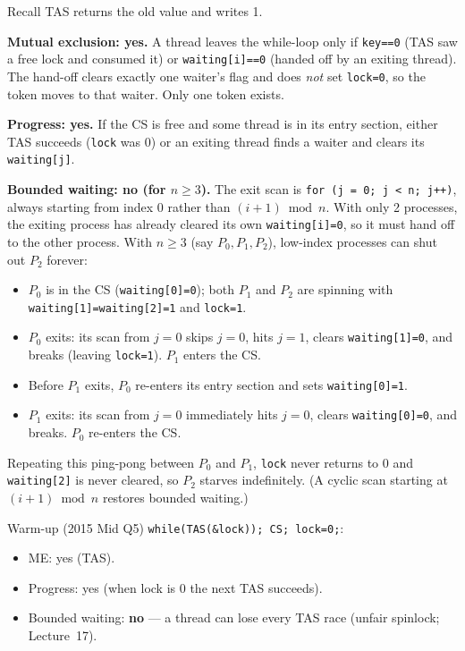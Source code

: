 \documentclass[11pt,a4paper]{article}
\newenvironment{Sol}{%
  \begin{tcolorbox}[sboxstyle, title={Solution}]%
}{%
  \end{tcolorbox}\vspace{0.35em}%
}
\begin{document}
\begin{Sol}
Recall TAS returns the old value and writes 1.

\textbf{Mutual exclusion: yes.} A thread leaves the while-loop only if \texttt{key==0} (TAS saw a free lock and consumed it) or \texttt{waiting[i]==0} (handed off by an exiting thread). The hand-off clears exactly one waiter's flag and does \emph{not} set \texttt{lock=0}, so the token moves to that waiter. Only one token exists.

\textbf{Progress: yes.} If the CS is free and some thread is in its entry section, either TAS succeeds (\texttt{lock} was 0) or an exiting thread finds a waiter and clears its \texttt{waiting[j]}.

\textbf{Bounded waiting: no (for $n \ge 3$).} The exit scan is \texttt{for (j = 0; j < n; j++)}, always starting from index 0 rather than $(i+1)\bmod n$. With only 2 processes, the exiting process has already cleared its own \texttt{waiting[i]=0}, so it must hand off to the other process. With $n \ge 3$ (say $P_0, P_1, P_2$), low-index processes can shut out $P_2$ forever:
\begin{itemize}
  \item $P_0$ is in the CS (\texttt{waiting[0]=0}); both $P_1$ and $P_2$ are spinning with \texttt{waiting[1]=waiting[2]=1} and \texttt{lock=1}.
  \item $P_0$ exits: its scan from $j=0$ skips $j=0$, hits $j=1$, clears \texttt{waiting[1]=0}, and breaks (leaving \texttt{lock=1}). $P_1$ enters the CS.
  \item Before $P_1$ exits, $P_0$ re-enters its entry section and sets \texttt{waiting[0]=1}.
  \item $P_1$ exits: its scan from $j=0$ immediately hits $j=0$, clears \texttt{waiting[0]=0}, and breaks. $P_0$ re-enters the CS.
\end{itemize}
Repeating this ping-pong between $P_0$ and $P_1$, \texttt{lock} never returns to 0 and \texttt{waiting[2]} is never cleared, so $P_2$ starves indefinitely. (A cyclic scan starting at $(i+1)\bmod n$ restores bounded waiting.)

Warm-up (2015 Mid Q5) \texttt{while(TAS(\&lock)); CS; lock=0;}:
\begin{itemize}
\item ME: yes (TAS).
\item Progress: yes (when lock is 0 the next TAS succeeds).
\item Bounded waiting: \textbf{no} --- a thread can lose every TAS race (unfair spinlock; Lecture~17).
\end{itemize}
\end{Sol}
\end{document}
